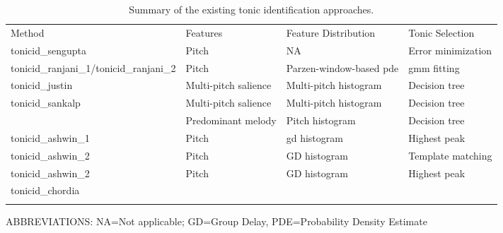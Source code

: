 \begin{table}
	\begin{threeparttable} 
		\begin{centering}
			\begin{tabular}{l L{4.5cm} L{4.5cm} L{3.5cm} }
				\tabletop			
				Method 	&	Features	&	Feature Distribution	&	Tonic Selection \\
				\tablemid			
				\acrshort{tonicid_sengupta} \citep{Sengupta2005b}	&	Pitch \citep{AKDatta_1996} & NA & Error minimization\\
				
				\acrshort{tonicid_ranjani_1}/\acrshort{tonicid_ranjani_2} \citep{ranjani2011carnatic}	&	Pitch \citep{BoersmaPaul2001} & Parzen-window-based \acrshort{pde} & \acrshort{gmm} fitting\\
				
				\acrshort{tonicid_justin} \citep{salamon2012multipitch} & Multi-pitch salience \citep{Salamon2011} & Multi-pitch histogram & Decision tree\\
				
				\acrshort{tonicid_sankalp} \citep{gulati2012two}	& Multi-pitch salience \citep{Salamon2011} & Multi-pitch histogram & Decision tree\\
				
				&	Predominant melody \citep{Salamon2012} & Pitch histogram & Decision tree\\
				
				\acrshort{tonicid_ashwin_1} \citep{bellur2012knowledge}	&	Pitch \citep{DeCheveigne2002}	& \acrshort{gd} histogram & Highest peak\\
				
				\acrshort{tonicid_ashwin_2} \citep{bellur2012knowledge}	&	Pitch \citep{DeCheveigne2002}	& 	GD histogram	&
				Template matching\\
				
				\acrshort{tonicid_ashwin_2} \citep{bellur2012knowledge}	&	Pitch \citep{DeCheveigne2002}	& 	GD histogram
				& Highest peak\\
				
				\acrshort{tonicid_chordia} \citep{chordia2013joint}	& 	& 	& \\			
				
				\tablebot		
			\end{tabular}
			\par \end{centering}		
		\begin{tablenotes}
			\small
			\item[] ABBREVIATIONS: NA=Not applicable; GD=Group Delay, PDE=Probability Density Estimate
		\end{tablenotes}
			\caption[Summary of the existing tonic identification approaches.]{Summary of the existing tonic identification approaches.}
			\label{tab:pre_processing_tonic_identification_summary_methods}
	\end{threeparttable}
\end{table}

